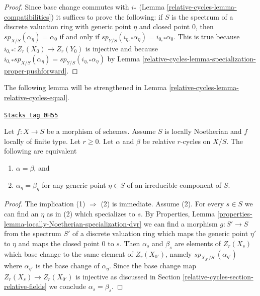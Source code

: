 \begin{proof}
Since base change commutes with $i_*$ (Lemma \ref{relative-cycles-lemma-compatibilities})
it suffices to prove the following: if $S$ is the spectrum of a discrete
valuation ring with generic point $\eta$ and closed point $0$,
then $sp_{X/S}(\alpha_\eta) = \alpha_0$ if and only if
$sp_{Y/S}(i_{\eta, *}\alpha_\eta) = i_{0, *}\alpha_0$.
This is true because $i_{0, *} : Z_r(X_0) \to Z_r(Y_0)$
is injective and because $i_{0, *}sp_{X/S}(\alpha_\eta) =
sp_{Y/S}(i_{\eta, *}\alpha_\eta)$ by
Lemma \ref{relative-cycles-lemma-specialization-proper-pushforward}.
\end{proof}

The following lemma will be strengthened in
Lemma \ref{relative-cycles-lemma-relative-cycles-equal}.

\begin{lemma}
\label{relative-cycles-lemma-uniqueness-extension}
\href{https://stacks.math.columbia.edu/tag/0H55}{\texttt{Stacks tag 0H55}}

Let $f : X \to S$ be a morphism of schemes. Assume $S$ is locally Noetherian
and $f$ locally of finite type. Let $r \geq 0$. Let $\alpha$ and $\beta$
be relative $r$-cycles on $X/S$. The following are equivalent
\begin{enumerate}
\item $\alpha = \beta$, and
\item $\alpha_\eta = \beta_\eta$ for any generic point $\eta \in S$
of an irreducible component of $S$.
\end{enumerate}
\end{lemma}

\begin{proof}
The implication (1) $\Rightarrow$ (2) is immediate.
Assume (2). For every $s \in S$ we can find an $\eta$ as in (2)
which specializes to $s$. By
Properties, Lemma \ref{properties-lemma-locally-Noetherian-specialization-dvr}
we can find a morphism $g : S' \to S$ from the
spectrum $S'$ of a discrete valuation ring which maps
the generic point $\eta'$ to $\eta$ and maps
the closed point $0$ to $s$. Then $\alpha_s$ and $\beta_s$
are elements of $Z_r(X_s)$ which base change to the same
element of $Z_r(X_{0'})$, namely $sp_{X_{S'}/S'}(\alpha_{\eta'})$
where $\alpha_{\eta'}$ is the base change of $\alpha_\eta$.
Since the base change map $Z_r(X_s) \to Z_r(X_{0'})$ is injective
as discussed in Section \ref{relative-cycles-section-relative-fields}
we conclude $\alpha_s = \beta_s$.
\end{proof}

